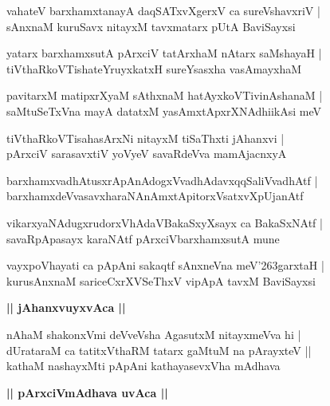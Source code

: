 \documentclass[twoside,12pt,openright]{book}
\def\S{\char'263}
\newcounter{shloka}[chapter]
\def\uvaca#1{\centerline{{\large\textbf{#1}}}}
\begin{document}
\begin{shloka}%
vahateV barxhamxtanayA daqSATxvXgerxV ca sureVshavxriV |\\
sAnxnaM kuruSavx nitayxM tavxmatarx pUtA BaviSayxsi
\end{shloka}

\begin{shloka}%
yatarx barxhamxsutA pArxciV tatArxhaM nAtarx saMshayaH |\\
tiVthaRkoVTishateYruyxkatxH sureYsasxha vasAmayxhaM
\end{shloka}

\begin{shloka}%
pavitarxM matipxrXyaM sAthxnaM hatAyxkoVTivinAshanaM |\\
saMtuSeTxVna mayA datatxM yasAmxtApxrXNAdhiikAsi meV 
\end{shloka}

\begin{shloka}%
tiVthaRkoVTisahasArxNi nitayxM tiSaThxti jAhanxvi |\\
pArxciV sarasavxtiV yoVyeV savaRdeVva mamAjacnxyA
\end{shloka}

\begin{shloka}%
barxhamxvadhAtusxrApAnAdogxVvadhAdavxqqSaliVvadhAtf |\\
barxhamxdeVvasavxharaNAnAmxtApitorxVsatxvXpUjanAtf
\end{shloka}

\begin{shloka}%
vikarxyaNAdugxrudorxVhAdaVBakaSxyXsayx ca BakaSxNAtf |\\
savaRpApasayx karaNAtf pArxciVbarxhamxsutA mune
\end{shloka}

\begin{shloka}%
vayxpoVhayati ca pApAni sakaqtf sAnxneVna meV\S garxtaH |\\
kurusAnxnaM sariceCxrXVSeThxV vipApA tavxM BaviSayxsi
\end{shloka}

\uvaca{|| jAhanxvuyxvAca ||}

\begin{shloka}%
nAhaM shakonxVmi deVveVsha AgasutxM nitayxmeVva hi |\\
dUrataraM ca tatitxVthaRM tatarx gaMtuM na pArayxteV ||\\
kathaM nashayxMti pApAni kathayasevxVha mAdhava
\end{shloka}

\uvaca{|| pArxciVmAdhava uvAca ||}
\end{document}

